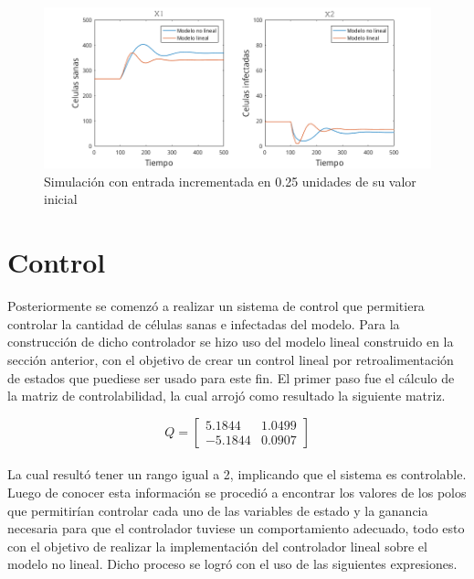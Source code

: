 \documentclass{article}
\begin{document}
\begin{figure}[H]
    \includegraphics[width=\textwidth]{Images/LinealU35.png}
    \caption{Simulación con entrada incrementada en 0.25 unidades de su valor inicial}
    \label{sim:linear3}
\end{figure}

\section{Control}

Posteriormente se comenzó a realizar un sistema de control que permitiera
controlar la cantidad de células sanas e infectadas del modelo. Para la construcción
de dicho controlador se hizo uso del modelo lineal construido en la sección anterior,
con el objetivo de crear un control lineal por retroalimentación de
estados que puediese ser usado para este fin. El primer paso fue el cálculo de
la matriz de controlabilidad, la cual arrojó como resultado la siguiente matriz.

\begin{equation*}
    Q = \begin{bmatrix}
            5.1844  & 1.0499 \\[0.25cm]
            -5.1844 & 0.0907
        \end{bmatrix}
\end{equation*}\\

La cual resultó tener un rango igual a 2, implicando que el sistema es controlable.
Luego de conocer esta información se procedió a encontrar los valores de los polos
que permitirían controlar cada uno de las variables de estado y la ganancia necesaria
para que el controlador tuviese un comportamiento adecuado, todo esto con el objetivo de
realizar la implementación del controlador lineal sobre el modelo no lineal.
Dicho proceso se logró con el uso de las siguientes expresiones.\\
\end{document}
